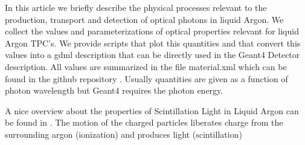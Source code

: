 \documentclass{article}
\begin{document}
  In this article we briefly
  describe the physical processes relevant to the production, transport and detection of optical photons in liquid Argon.
  We collect the
  values and parameterizations of optical properties relevant for liquid Argon TPC's. We provide scripts that plot this quantities and that convert this values
  into a gdml description that can be directly used in the Geant4 Detector description.
  All values are summarized in the file material.xml which can be found in the github repository \cite{ref:scripts}.
  Usually quantities are given as a function of photon wavelength but Geant4 requires the photon energy.
  
  A nice overview about the properties of Scintillation Light in Liquid Argon can be found in \cite{ref:ben}.
  The motion of the charged particles liberates
charge from the surrounding argon (ionization) and
produces light (scintillation)



 
\end{document}
